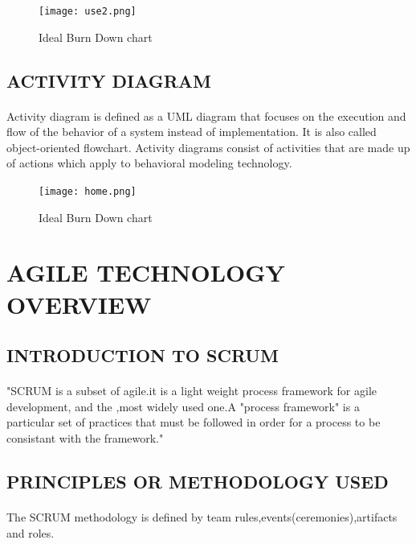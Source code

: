 \documentclass[a4paper, 12pt]{report}
\begin{document}
\begin{figure}[!htb]
\begin{center}
	\texttt{[image: use2.png]}
	\caption{Ideal Burn Down chart}
\end{center}
\end{figure}
\newpage
\subsection{ACTIVITY DIAGRAM}
\paragraph{}Activity diagram is defined as a UML diagram that focuses on the execution and flow of the behavior of a system instead of implementation. It is also called object-oriented flowchart. Activity diagrams consist of activities that are made up of actions which apply to behavioral modeling technology.

\begin{figure}[!htb]
\begin{center}
	\texttt{[image: home.png]}
	\caption{Ideal Burn Down chart}
\end{center}
\end{figure}



\newpage
\section{AGILE TECHNOLOGY OVERVIEW  }
\subsection{ INTRODUCTION TO SCRUM}
\paragraph{}"SCRUM is a subset of agile.it is a light weight process framework for agile
development, and the ,most widely used one.A "process framework" is a particular set of practices that must be followed in order for a process to be consistant with the framework."
\subsection{ PRINCIPLES OR METHODOLOGY USED }
\paragraph{}The SCRUM methodology is defined by team rules,events(ceremonies),artifacts and roles.
\end{document}
